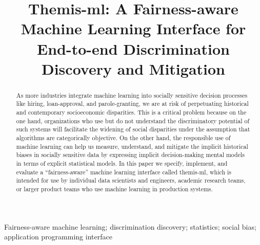 \documentclass{interact}
\begin{document}

\title{
  Themis-ml: A Fairness-aware Machine Learning Interface for \\
  End-to-end Discrimination Discovery and Mitigation
}


\author{
}

\maketitle

\begin{abstract}
As more industries integrate machine learning into socially sensitive decision
processes like hiring, loan-approval, and parole-granting, we are at risk of
perpetuating historical and contemporary socioeconomic disparities. This is a
critical problem because on the one hand, organizations who use but do not
understand the discriminatory potential of such systems will facilitate the
widening of social disparities under the assumption that algorithms are
categorically objective. On the other hand, the responsible use of machine
learning can help us measure, understand, and mitigate the implicit historical
biases in socially sensitive data by expressing implicit decision-making mental
models in terms of explicit statistical models. In this paper we specify,
implement, and evaluate a ``fairness-aware'' machine learning interface called
themis-ml, which is intended for use by individual data scientists and
engineers, academic research teams, or larger product teams who use machine
learning in production systems.
\end{abstract}

\begin{keywords}
Fairness-aware machine learning; discrimination discovery; statistics;
social bias; application programming interface
\end{keywords}
\end{document}
